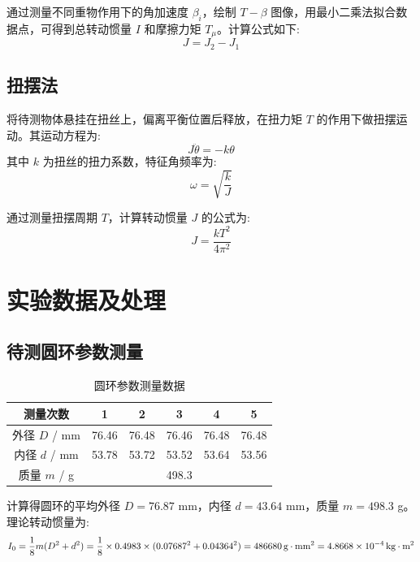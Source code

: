 \documentclass[UTF8]{ctexart}
\begin{document}
通过测量不同重物作用下的角加速度 \(\beta_i\)，绘制 \(T-\beta\) 图像，用最小二乘法拟合数据点，可得到总转动惯量 \(I\) 和摩擦力矩 \(T_{\mu}\)。计算公式如下:
\begin{equation}
J = J_2 - J_1
\end{equation}

\subsection{扭摆法}
将待测物体悬挂在扭丝上，偏离平衡位置后释放，在扭力矩 \(T\) 的作用下做扭摆运动。其运动方程为:
\begin{equation}
J \ddot{\theta} = -k \theta
\end{equation}
其中 \(k\) 为扭丝的扭力系数，特征角频率为:
\begin{equation}
\omega = \sqrt{\frac{k}{J}}
\end{equation}

通过测量扭摆周期 \(T\)，计算转动惯量 \(J\) 的公式为:
\begin{equation}
J = \frac{k T^2}{4 \pi^2}
\end{equation}

\section{实验数据及处理}
\subsection{待测圆环参数测量}
\begin{table}[h]
    \centering
    \caption{圆环参数测量数据}
    \begin{tabular}{cccccc}
        \toprule
        测量次数 & 1 & 2 & 3 & 4 & 5 \\
        \midrule
        外径 \(D\) / mm & 76.46 & 76.48 & 76.46 & 76.48 & 76.48 \\
        内径 \(d\) / mm & 53.78 & 53.72 & 53.52 & 53.64 & 53.56 \\
        质量 \(m\) / g & \multicolumn{5}{c}{498.3} \\
        \bottomrule
    \end{tabular}
\end{table}

计算得圆环的平均外径 \(D = 76.87\) mm，内径 \(d = 43.64\) mm，质量 \(m = 498.3\) g。理论转动惯量为:
\begin{equation}
I_0 = \frac{1}{8} m (D^2 + d^2) = \frac{1}{8} \times 0.4983 \times (0.07687^2 + 0.04364^2) = 486680  \, \text{g} \cdot \text{mm}^2 \\ = 4.8668\times 10^{-4}\, \text{kg} \cdot \text{m}^2
\end{equation}
\end{document}
